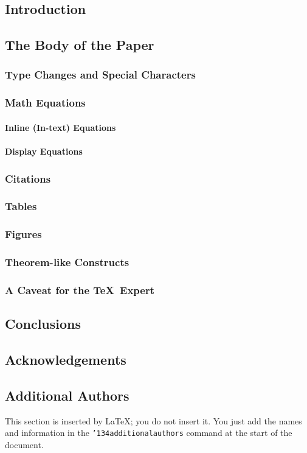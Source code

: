 \documentclass{sigkddExp}
\begin{document}
\subsection{Introduction}
\subsection{The Body of the Paper}
\subsubsection{Type Changes and Special Characters}
\subsubsection{Math Equations}
\paragraph{Inline (In-text) Equations}
\paragraph{Display Equations}
\subsubsection{Citations}
\subsubsection{Tables}
\subsubsection{Figures}
\subsubsection{Theorem-like Constructs}
\subsubsection*{A Caveat for the \TeX\ Expert}
\subsection{Conclusions}
\subsection{Acknowledgements}
\subsection{Additional Authors}
This section is inserted by \LaTeX; you do not insert it.
You just add the names and information in the
\texttt{{\char'134}additionalauthors} command at the start
of the document.
\end{document}
